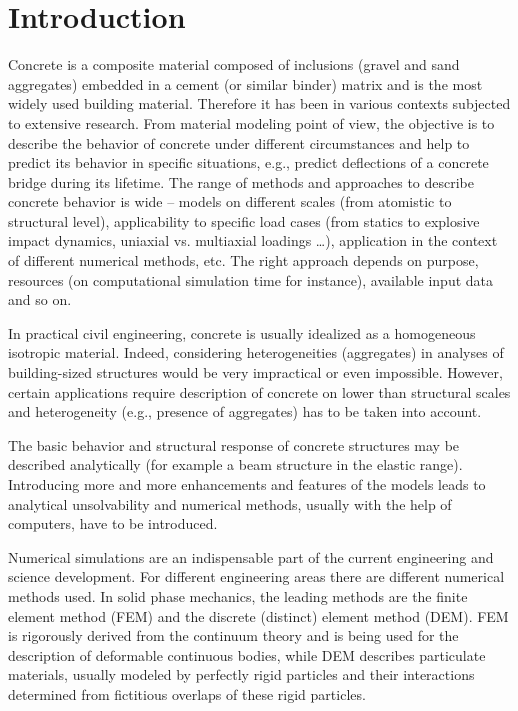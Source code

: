 \chapter{Introduction}

Concrete is a composite material composed of inclusions (gravel and sand aggregates) embedded in a cement (or similar binder) matrix and is the most widely used building material.
Therefore it has been in various contexts subjected to extensive research.
From material modeling point of view, the objective is to describe the behavior of concrete under different circumstances and help to predict its behavior in specific situations, e.g., predict deflections of a concrete bridge during its lifetime.
The range of methods and approaches to describe concrete behavior is wide -- models on different scales (from atomistic to structural level), applicability to specific load cases (from statics to explosive impact dynamics, uniaxial vs. multiaxial loadings \dots), application in the context of different numerical methods, etc.
The right approach depends on purpose, resources (on computational simulation time for instance), available input data and so on.

In practical civil engineering, concrete is usually idealized as a homogeneous isotropic material.
Indeed, considering heterogeneities (aggregates) in analyses of building-sized structures would be very impractical or even impossible.
However, certain applications require description of concrete on lower than structural scales and heterogeneity (e.g., presence of aggregates) has to be taken into account.

The basic behavior and structural response of concrete structures may be described analytically (for example a beam structure in the elastic range).
Introducing more and more enhancements and features of the models leads to analytical unsolvability and numerical methods, usually with the help of computers, have to be introduced.


Numerical simulations are an indispensable part of the current engineering and science development.
For different engineering areas there are different numerical methods used.
In solid phase mechanics, the leading methods are the finite element method (FEM) and the discrete (distinct) element method (DEM).
FEM is rigorously derived from the continuum theory and is being used for the description of deformable continuous bodies, while DEM describes particulate materials, usually modeled by perfectly rigid particles and their interactions determined from fictitious overlaps of these rigid particles.

